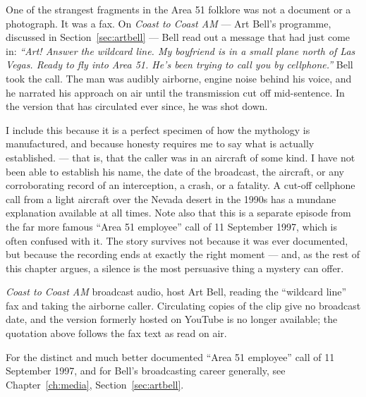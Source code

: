 \begin{funfact}
One of the strangest fragments in the Area 51 folklore was not a document or a photograph. It was a
fax. On \emph{Coast to Coast AM} --- Art Bell's programme, discussed in Section~\ref{sec:artbell} ---
Bell read out a message that had just come in: \emph{``Art! Answer the wildcard line. My boyfriend is
in a small plane north of Las Vegas. Ready to fly into Area 51. He's been trying to call you by
cellphone.''} Bell took the call. The man was audibly airborne, engine noise behind his voice, and he
narrated his approach on air until the transmission cut off mid-sentence. In the version that has
circulated ever since, he was shot down.

I include this because it is a perfect specimen of how the mythology is manufactured, and because
honesty requires me to say what is actually established.  --- that is, that the caller was in an aircraft of some kind. I
have not been able to establish his name, the date of the broadcast, the aircraft, or any
corroborating record of an interception, a crash, or a fatality. A cut-off cellphone call from a light
aircraft over the Nevada desert in the 1990s has a mundane explanation available at all times. Note
also that this is a separate episode from the far more famous ``Area 51 employee'' call of 11
September 1997, which is often confused with it. The story survives not because it was ever
documented, but because the recording ends at exactly the right moment --- and, as the rest of this
chapter argues, a silence is the most persuasive thing a mystery can offer.
\end{funfact}

\begin{srcnotes}
\item \emph{Coast to Coast AM} broadcast audio, host Art Bell, reading the ``wildcard line'' fax and
taking the airborne caller. Circulating copies of the clip give no broadcast date, and the version
formerly hosted on YouTube is no longer available; the quotation above follows the fax text as read on
air.
\item For the distinct and much better documented ``Area 51 employee'' call of 11 September 1997, and
for Bell's broadcasting career generally, see Chapter~\ref{ch:media}, Section~\ref{sec:artbell}.
\end{srcnotes}
